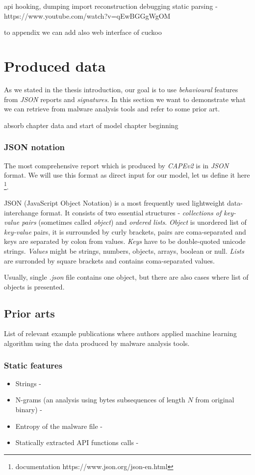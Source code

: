 api hooking, dumping import reconstruction debugging static parsing - https://www.youtube.com/watch?v=qEwBGGgWgOM

to appendix we can add also web interface of cuckoo


\section{Produced data}
As we stated in the thesis introduction, our goal is to use \emph{behavioural} features from \emph{JSON} reports and \emph{signatures}. In this section we want to demonstrate what we can retrieve from malware analysis tools and refer to some prior art.

absorb chapter data and start of model chapter beginning

\subsubsection{JSON notation} \label{sec:json_notation}
The most comprehensive report which is produced by \emph{CAPEv2} is in \emph{JSON} format. We will use this format as direct input for our model, let us define it here \footnote{documentation https://www.json.org/json-en.html}.

JSON (JavaScript Object Notation) is a most frequently used lightweight data-interchange format. It consists of two essential structures - \emph{collections of key-value pairs} (sometimes called \emph{object}) and \emph{ordered lists}. 
\emph{Object} is unordered list of \emph{key-value} pairs, it is surrounded by curly brackets, pairs are coma-separated and keys are separated by colon from values. \emph{Keys} have to be double-quoted unicode strings. \emph{Values} might be strings, numbers, objects, arrays, boolean or null. \emph{Lists} are surronded by square brackets and contains coma-separated values.

Usually, single \emph{.json} file contains one object, but there are also cases where list of objects is presented.

\subsection{Prior arts}
List of relevant example publications where authors applied machine learning algorithm using the data produced by malware analysis tools.
\subsubsection{Static features}
\begin{itemize}
  \item Strings - \cite{Lee2011}
  \item N-grams (an analysis using bytes subsequences of length $N$ from original binary) - \cite{Fuyong2017}
  \item Entropy of the malware file - \cite{Wojnowicz2018}
  \item Statically extracted API functions calls - \cite{Ahmadi2016}
\end{itemize}

